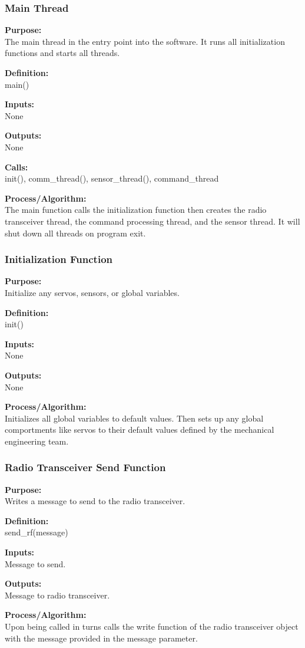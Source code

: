 \documentclass[10pt,draftclsnofoot,onecolumn,retainorgcmds]{IEEEtran}
\begin{document}
\subsubsection{Main Thread}
{\bf Purpose:} \\
The main thread in the entry point into the software. It runs all initialization functions and starts all threads. \par
{\bf Definition:} \\ 
main() \par
{\bf Inputs:} \\  None \par
{\bf Outputs:} \\ None \par
{\bf Calls:} \\ init(), comm\_thread(), sensor\_thread(), command\_thread \par
{\bf Process/Algorithm:} \\
The main function calls the initialization function then creates the radio transceiver thread, the command processing thread, and the sensor thread. It will shut down all threads on program exit. \par
\subsubsection{Initialization Function}
{\bf Purpose:} \\
Initialize any servos, sensors, or global variables. \par
{\bf Definition:} \\ 
init() \par
{\bf Inputs:} \\  None \par
{\bf Outputs:} \\ None \par
{\bf Process/Algorithm:} \\
Initializes all global variables to default values. Then sets up any global comportments like servos to their default values defined by the mechanical engineering team. \par
\subsubsection{Radio Transceiver Send Function}
{\bf Purpose:} \\
Writes a message to send to the radio transceiver. \par
{\bf Definition:} \\ 
send\_rf(message) \par
{\bf Inputs:} \\  Message to send. \par
{\bf Outputs:} \\ Message to radio transceiver. \par
{\bf Process/Algorithm:} \\
Upon being called in turns calls the write function of the radio transceiver object with the message provided in the message parameter. 
\end{document}

